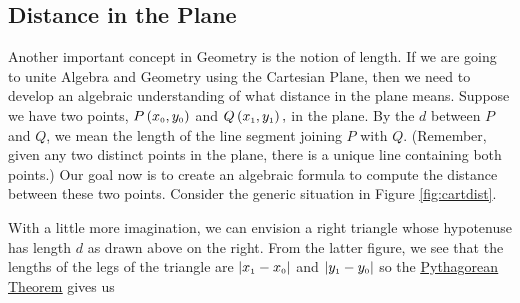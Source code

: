 \medskip


\subsection{Distance in the Plane}

Another important concept in Geometry is the notion of length.  If we are going to unite Algebra and Geometry using the Cartesian Plane, then we need to develop an algebraic understanding of what distance in the plane means.  Suppose we have two points, $P\left(x_{\mbox{\tiny$0$}}, y_{\mbox{\tiny$0$}}\right)$ and $Q\left(x_{\mbox{\tiny$1$}}, y_{\mbox{\tiny$1$}}\right),$ in the plane. By the   $d$  between $P$ and $Q$, we mean the length of the line segment joining $P$ with $Q$.  (Remember, given any two distinct points in the plane, there is a unique line containing both points.)  Our goal now is to create an algebraic formula to compute the distance between these two points. Consider the generic situation in Figure \ref{fig:cartdist}.

\medskip


\medskip

With a little more imagination, we can envision a right triangle whose hypotenuse has length $d$ as drawn above on the right.  From the latter figure, we see that the lengths of the legs of the triangle are $\left|x_{\mbox{\tiny$1$}} - x_{\mbox{\tiny$0$}}\right|$ and $\left|y_{\mbox{\tiny$1$}} - y_{\mbox{\tiny$0$}}\right|$ so the \href{http://en.wikipedia.org/wiki/Pythagorean_Theorem}{\underline{Pythagorean Theorem}} gives us
 
